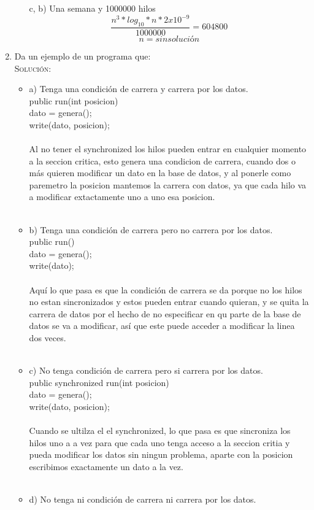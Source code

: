 \documentclass[letterpaper,10pt]{article}
\begin{document}
\begin{enumerate}
\begin{itemize}
	\item[c, b) ] Una semana y 1000000 hilos
	$$\frac{n^3*log_{10}*n*2x10^{-9}}{1000000}=604800$$
	$$n = sin solución$$
	
	\end{itemize}

    
    \item Da un ejemplo de un programa que:\\
	
    \textsc{Solución:}
	\\ 
	\begin{itemize}
	
	\item a) Tenga una condición de carrera y carrera por los datos.\\
	
	public run(int posicion)\\ 
	dato = genera();\\
	write(dato, posicion);\\
	\\
	Al no tener el synchronized los hilos pueden entrar en cualquier momento a la seccion critica, esto genera una condicion de carrera, cuando dos o más quieren modificar un dato en la base de datos, y al ponerle como paremetro la posicion mantemos la carrera con datos, ya que cada hilo va a modificar extactamente uno a uno esa posicion. \\
	\\
	\item b) Tenga una condición de carrera pero no carrera por los datos. \\
	
	public run() \\
	dato = genera();\\
	write(dato);\\
	\\
	Aquí lo que pasa es que la condición de carrera se da porque no los hilos no estan sincronizados y estos pueden entrar cuando quieran, y se quita la carrera de datos por el hecho de no especificar en qu parte de la base de datos se va a modificar, así que este puede acceder a modificar la linea dos veces.\\
	\\
	\item c) No tenga condición de carrera pero si carrera por los datos.\\
	
	public synchronized run(int posicion) \\
	dato = genera();\\
	write(dato, posicion);\\
	\\
	Cuando se ultilza el el synchronized, lo que pasa es que sincroniza los hilos uno a a vez para que cada uno tenga acceso a la seccion critia y pueda modificar los datos sin ningun problema, aparte con la posicion escribimos exactamente un dato a la vez. \\
	\\
	\item d) No tenga ni condición de carrera ni carrera por los datos.\\
	

\end{itemize}
\end{enumerate}
\end{document}

